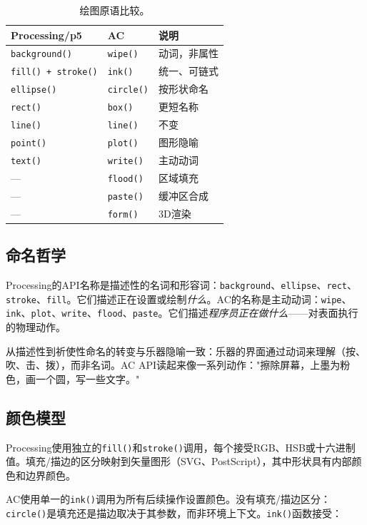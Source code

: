 \documentclass[10pt,letterpaper,twocolumn]{article}
\begin{document}
\begin{table}[h]
\small
\centering
\begin{tabularx}{\columnwidth}{lXX}
\toprule
\textbf{Processing/p5} & \textbf{AC} & \textbf{说明} \\
\midrule
\texttt{background()} & \texttt{wipe()} & 动词，非属性 \\
\texttt{fill() + stroke()} & \texttt{ink()} & 统一、可链式 \\
\texttt{ellipse()} & \texttt{circle()} & 按形状命名 \\
\texttt{rect()} & \texttt{box()} & 更短名称 \\
\texttt{line()} & \texttt{line()} & 不变 \\
\texttt{point()} & \texttt{plot()} & 图形隐喻 \\
\texttt{text()} & \texttt{write()} & 主动动词 \\
--- & \texttt{flood()} & 区域填充 \\
--- & \texttt{paste()} & 缓冲区合成 \\
--- & \texttt{form()} & 3D渲染 \\
\bottomrule
\end{tabularx}
\caption{绘图原语比较。}
\label{tab:drawing}
\end{table}

\subsection{命名哲学}

Processing的API名称是描述性的名词和形容词：\texttt{background}、\texttt{ellipse}、\texttt{rect}、\texttt{stroke}、\texttt{fill}。它们描述正在设置或绘制\emph{什么}。AC的名称是主动动词：\texttt{wipe}、\texttt{ink}、\texttt{plot}、\texttt{write}、\texttt{flood}、\texttt{paste}。它们描述\emph{程序员正在做什么}——对表面执行的物理动作。

从描述性到祈使性命名的转变与乐器隐喻一致：乐器的界面通过动词来理解（按、吹、击、拨），而非名词。AC API读起来像一系列动作："擦除屏幕，上墨为粉色，画一个圆，写一些文字。"

\subsection{颜色模型}

Processing使用独立的\texttt{fill()}和\texttt{stroke()}调用，每个接受RGB、HSB或十六进制值。填充/描边的区分映射到矢量图形（SVG、PostScript），其中形状具有内部颜色和边界颜色。

AC使用单一的\texttt{ink()}调用为所有后续操作设置颜色。没有填充/描边区分：\texttt{circle()}是填充还是描边取决于其参数，而非环境上下文。\texttt{ink()}函数接受：
\end{document}
